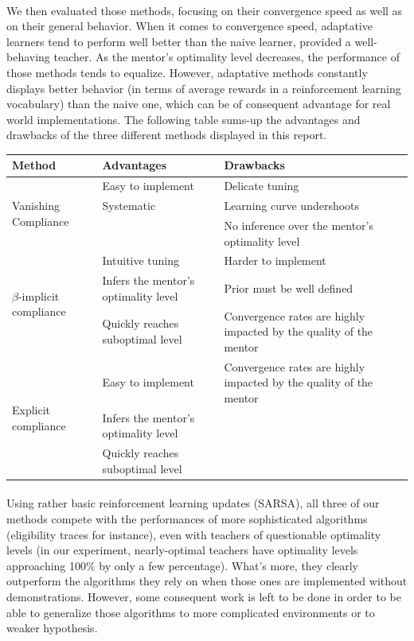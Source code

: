 \documentclass[a4paper]{report}
\begin{document}
{{{			\paragraph{} We then evaluated those methods, focusing on their convergence speed as well as on their general behavior. When it comes to convergence speed, adaptative learners tend to perform well better than the naive learner, provided a well-behaving teacher. As the mentor's optimality level decreases, the performance of those methods tends to equalize. 
			\newline However, adaptative methods constantly displays better behavior (in terms of average rewards in a reinforcement learning vocabulary) than the naive one, which can be of consequent advantage for real world implementations. The following table sums-up the advantages and drawbacks of the three different methods displayed in this report. 
			
			\begin{center}
				\begin{tabularx}{\textwidth}{|X|X|X|}
					\hline
					\textbf{Method} & \textbf{Advantages} & \textbf{Drawbacks}\\
					\hline
					\multirow{3}{*}{Vanishing Compliance} & Easy to implement & Delicate tuning\\
												   & Systematic & Learning curve undershoots \\
												   & & No inference over the mentor's optimality level \\
					\hline
					\multirow{3}{*}{$\beta$-implicit compliance} &  Intuitive tuning & Harder to implement \\
													  & Infers the mentor's optimality level & Prior must be well defined \\
													  & Quickly reaches suboptimal level & Convergence rates are highly impacted by the quality of the mentor \\ 
					\hline
					\multirow{3}{*}{Explicit compliance} &  Easy to implement &  Convergence rates are highly impacted by the quality of the mentor \\
					& Infers the mentor's optimality level  & \\
					& Quickly reaches suboptimal level  & \\
					\hline
				\end{tabularx}
			\end{center}
			
			\paragraph{} Using rather basic reinforcement learning updates (SARSA), all three of our methods compete with the performances of more sophisticated algorithms (eligibility traces for instance), even with teachers of questionable optimality levels (in our experiment, nearly-optimal teachers have optimality levels approaching 100\% by only a few percentage). What's more, they clearly outperform the algorithms they rely on when those ones are implemented without demonstrations. However, some consequent work is left to be done in order to be able to generalize those algorithms to more complicated environments or to weaker hypothesis. 
		}
}}
\end{document}
